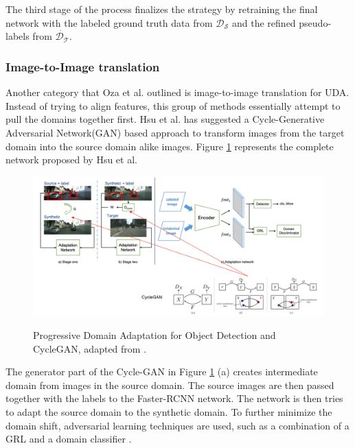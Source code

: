 The third stage of the process finalizes the strategy by retraining the final network with the labeled ground truth data from $\mathcal{D_S}$ and the refined pseudo-labels from $\dot{\mathcal{D_T}}$. 


\subsubsection{Image-to-Image translation}
\label{imagetoimage} 
Another category that Oza et al. \cite{Oza2021} outlined is image-to-image translation for UDA. Instead of trying to align features, this group of methods essentially attempt to pull the domains together first. Hsu et al. \cite{Hsu2019} has suggested a Cycle-Generative Adversarial Network(GAN) \cite{Zhu2017} based approach to transform images from the target domain into the source domain alike images. Figure \ref{gan} represents the complete network proposed by Hsu et al. 

\begin{figure}[htb]
	\begin{center}
		\includegraphics[width=16cm]{./GAN.png}
	\end{center}
	\caption{Progressive Domain Adaptation for Object Detection and CycleGAN, adapted from \cite{Hsu2019}.}
	\begin{center}
		\label{gan}
	\end{center}
\end{figure}
\FloatBarrier

The generator part of the Cycle-GAN in Figure \ref{gan} (a) creates intermediate domain from images in the source domain. The source images are then passed together with the labels to the Faster-RCNN network. The network is then tries to adapt the source domain to the synthetic domain. To further minimize the domain shift, adversarial learning techniques are used, such as a combination of a GRL and a domain classifier \cite{Hsu2019}.


